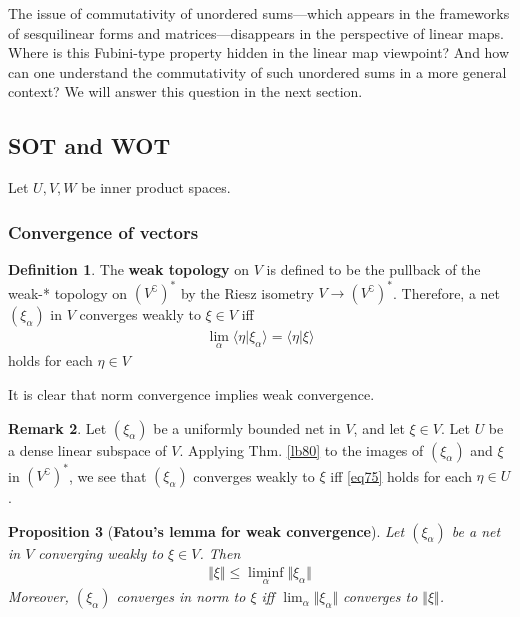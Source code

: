 \documentclass[12pt,b5paper,notitlepage]{article}
\theoremstyle{definition}
\newtheorem{df}{Definition}[section]
\newtheorem{rem}[df]{Remark}
\theoremstyle{plain}
\newtheorem{pp}[df]{Proposition}
\newcommand{\bk}[1]{\langle {#1}\rangle}
\newcommand{\Co}{\complement}
\numberwithin{equation}{section}
\begin{document}
The issue of commutativity of unordered sums---which appears in the frameworks of sesquilinear forms and matrices---disappears in the perspective of linear maps. Where is this Fubini-type property hidden in the linear map viewpoint? And how can one understand the commutativity of such unordered sums in a more general context? We will answer this question in the next section.




\subsection{SOT and WOT}



Let $U,V,W$ be inner product spaces.

\subsubsection{Convergence of vectors}


\begin{df}
The \textbf{weak topology} on $V$  is defined to be the pullback of the weak-* topology on $(V^\Co)^*$ by the Riesz isometry $V\rightarrow (V^\Co)^*$. Therefore, a net $(\xi_\alpha)$ in $V$ converges weakly to $\xi \in V$ iff
\begin{align}\label{eq75}
\lim_\alpha\bk{\eta|\xi_\alpha}=\bk{\eta|\xi}
\end{align}
holds for each $\eta\in V$
\end{df}

It is clear that norm convergence implies weak convergence.


\begin{rem}
Let $(\xi_\alpha)$ be a uniformly bounded net in $V$, and let $\xi\in V$. Let $U$ be a dense linear subspace of $V$. Applying Thm. \ref{lb80} to the images of $(\xi_\alpha)$ and $\xi$ in $(V^\Co)^*$, we see that $(\xi_\alpha)$ converges weakly to $\xi$ iff \eqref{eq75} holds for each $\eta\in U$. 
\end{rem}



\begin{pp}[\textbf{Fatou's lemma for weak convergence}]\label{lb153} 
Let $(\xi_\alpha)$ be a net in $V$ converging weakly to $\xi\in V$. Then
\begin{align}\label{eq76}
\Vert\xi\Vert\leq\liminf_\alpha\Vert\xi_\alpha\Vert
\end{align}
Moreover, $(\xi_\alpha)$ converges in norm to $\xi$ iff  $\lim_\alpha\Vert\xi_\alpha\Vert$ converges to $\Vert\xi\Vert$.
\end{pp}
\end{document}
